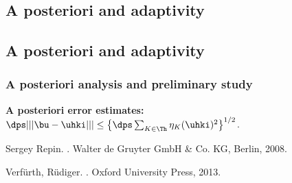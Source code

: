 \documentclass[10 pt]{beamer}
\begin{document}
\begin{frame}
\section{A posteriori and adaptivity}
\subsection{A posteriori and adaptivity}
\frametitle{A posteriori analysis and preliminary study}
\alert{\textbf{A posteriori error estimates:}}
$\dps |||\bu-\uhki||| \leq \left\{\dps \sum_{\substack{K \in\Th}} \eta_K(\uhki)^2\right\}^{1/2}$.\\

\scriptsize{
\begin{thebibliography}{10}
Sergey Repin.
.
\newblock Walter de Gruyter GmbH \& Co. KG, Berlin, 2008.
\end{thebibliography}
}

\scriptsize{
\begin{thebibliography}{10}
Verf\"urth, R\"udiger.
.
\newblock Oxford University Press, 2013.
\end{thebibliography}
}


\end{frame}
\end{document}

